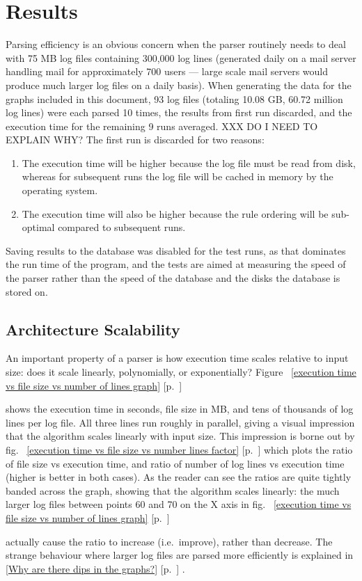\documentclass[draft]{svmult}
\newcommand{\refwithpage}[1]{%
    \empty{}\ref{#1} [p.~\pageref{#1}]%
}
\newcommand{\sectionref}[1]{%
    \textsection{}\refwithpage{#1}%
}
\newcommand{\numberOFlogFILES}[0]{%
    93%
}
\newcommand{\numberOFlogLINEShuman}[0]{%
    60.72 million%
}
\begin{document}
\section{Results}

Parsing efficiency is an obvious concern when the parser routinely needs to
deal with 75 MB log files containing 300,000 log lines (generated daily on
a mail server handling mail for approximately 700 users --- large scale
mail servers would produce much larger log files on a daily basis).  When
generating the data for the graphs included in this document,
\numberOFlogFILES{} log files (totaling 10.08 GB, \numberOFlogLINEShuman{}
log lines) were each parsed 10 times, the results from first run discarded,
and the execution time for the remaining 9 runs averaged.  XXX DO I NEED TO
EXPLAIN WHY\@?  The first run is discarded for two reasons:

\begin{enumerate}

    \item The execution time will be higher because the log file must be
        read from disk, whereas for subsequent runs the log file will be
        cached in memory by the operating system.

    \item The execution time will also be higher because the rule ordering
        will be sub-optimal compared to subsequent runs.

\end{enumerate}

Saving results to the database was disabled for the test runs, as that
dominates the run time of the program, and the tests are aimed at measuring
the speed of the parser rather than the speed of the database and the disks
the database is stored on.

\subsection{Architecture Scalability}

An important property of a parser is how execution time scales relative to
input size: does it scale linearly, polynomially, or exponentially?
Figure~\refwithpage{execution time vs file size vs number of lines graph}
shows the execution time in seconds, file size in MB, and tens of thousands
of log lines per log file.  All three lines run roughly in parallel, giving
a visual impression that the algorithm scales linearly with input size.
This impression is borne out by fig.~\refwithpage{execution time vs file
size vs number lines factor} which plots the ratio of file size vs
execution time, and ratio of number of log lines vs execution time (higher
is better in both cases).  As the reader can see the ratios are quite
tightly banded across the graph, showing that the algorithm scales
linearly: the much larger log files between points 60 and 70 on the X axis
in fig.~\refwithpage{execution time vs file size vs number of lines graph}
actually cause the ratio to increase (i.e.\ improve), rather than decrease.
The strange behaviour where larger log files are parsed more efficiently is
explained in \sectionref{Why are there dips in the graphs?}.  
\end{document}
